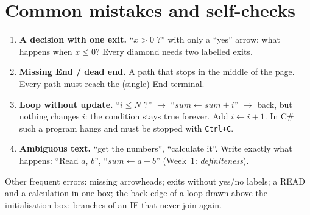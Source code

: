 \documentclass[11pt,a4paper]{article}
\begin{document}
\section{Common mistakes and self-checks}\label{sec:mistakes}
\begin{warnbox}
\begin{enumerate}[leftmargin=*,itemsep=2pt]
  \item \textbf{A decision with one exit.} ``$x>0$ ?'' with only a ``yes'' arrow: what happens when $x \le 0$? Every diamond needs two labelled exits.
  \item \textbf{Missing End / dead end.} A path that stops in the middle of the page. Every path must reach the (single) End terminal.
  \item \textbf{Loop without update.} ``$i \le N$ ?'' $\to$ ``$sum \gets sum + i$'' $\to$ back, but nothing changes $i$: the condition stays true forever. Add $i \gets i+1$. In C\# such a program hangs and must be stopped with \texttt{Ctrl+C}.
  \item \textbf{Ambiguous text.} ``get the numbers'', ``calculate it''. Write exactly what happens: ``Read $a$, $b$'', ``$sum \gets a + b$'' (Week~1: \emph{definiteness}).
\end{enumerate}
Other frequent errors: missing arrowheads; exits without yes/no labels; a READ and a calculation in one box; the back-edge of a loop drawn above the initialisation box; branches of an IF that never join again.
\end{warnbox}
\end{document}
